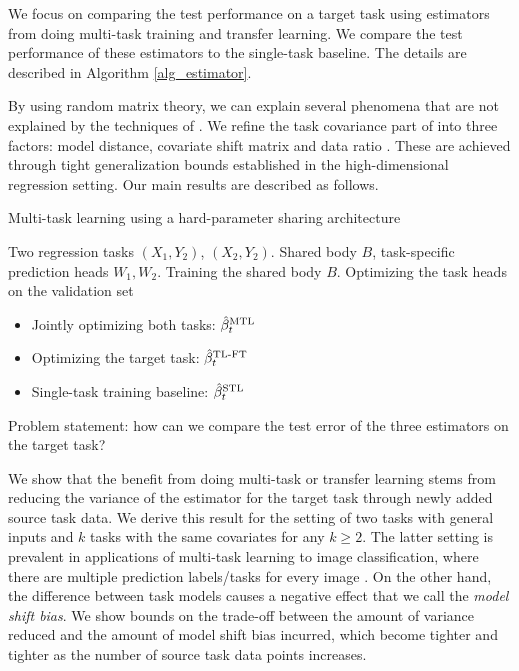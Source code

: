 We focus on comparing the test performance on a target task using estimators from doing multi-task training and transfer learning.
We compare the test performance of these estimators to the single-task baseline.
The details are described in Algorithm \ref{alg_estimator}.

By using random matrix theory, we can explain several phenomena that are not explained by the techniques of \cite{WZR20}.
We refine the task covariance part of \cite{WZR20} into three factors: model distance, covariate shift matrix and data ratio \cite{PY09,K18}.
These are achieved through tight generalization bounds established in the high-dimensional regression setting.
Our main results are described as follows.

\begin{algorithm}[!t]
	\caption{Multi-task learning using a hard-parameter sharing architecture}
	\label{alg_estimator}
	\begin{algorithmic}[1]
		\Input Two regression tasks $(X_1, Y_2)$, $(X_2, Y_2)$.
		\Param Shared body $B$, task-specific prediction heads $W_1, W_2$.
		\State Training the shared body $B$.
		\State Optimizing the task heads on the validation set

		\begin{itemize}
			\item Jointly optimizing both tasks: $\hat{\beta}_t^{\text{MTL}}$
			\item Optimizing the target task: $\hat{\beta}_t^{\text{TL-FT}}$
			\item Single-task training baseline: $\hat{\beta}_t^{\text{STL}}$
		\end{itemize}
		\State Problem statement: how can we compare the test error of the three estimators on the target task?
	\end{algorithmic}
\end{algorithm}

\smallskip
{}
	We show that the benefit from doing multi-task or transfer learning stems from reducing the variance of the estimator for the target task through newly added source task data.
	We derive this result for the setting of two tasks with general inputs and $k$ tasks with the same covariates for any $k \ge 2$.
	The latter setting is prevalent in applications of multi-task learning to image classification, where there are multiple prediction labels/tasks for every image \cite{EA20}.
	On the other hand, the difference between task models causes a negative effect that we call the \textit{model shift bias}.
	We show bounds on the trade-off between the amount of variance reduced and the amount of model shift bias incurred, which become tighter and tighter as the number of source task data points increases.

